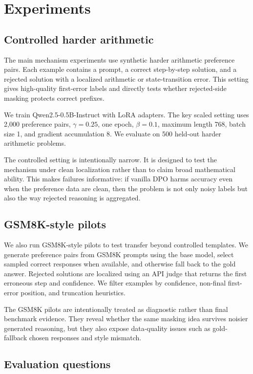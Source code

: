 \section{Experiments}

\subsection{Controlled harder arithmetic}

The main mechanism experiments use synthetic harder arithmetic preference pairs. Each example contains a prompt, a correct step-by-step solution, and a rejected solution with a localized arithmetic or state-transition error. This setting gives high-quality first-error labels and directly tests whether rejected-side masking protects correct prefixes.

We train Qwen2.5-0.5B-Instruct with LoRA adapters. The key scaled setting uses 2,000 preference pairs, $\gamma=0.25$, one epoch, $\beta=0.1$, maximum length 768, batch size 1, and gradient accumulation 8. We evaluate on 500 held-out harder arithmetic problems.

The controlled setting is intentionally narrow. It is designed to test the mechanism under clean localization rather than to claim broad mathematical ability. This makes failures informative: if vanilla DPO harms accuracy even when the preference data are clean, then the problem is not only noisy labels but also the way rejected reasoning is aggregated.

\subsection{GSM8K-style pilots}

We also run GSM8K-style pilots to test transfer beyond controlled templates. We generate preference pairs from GSM8K prompts using the base model, select sampled correct responses when available, and otherwise fall back to the gold answer. Rejected solutions are localized using an API judge that returns the first erroneous step and confidence. We filter examples by confidence, non-final first-error position, and truncation heuristics.

The GSM8K pilots are intentionally treated as diagnostic rather than final benchmark evidence. They reveal whether the same masking idea survives noisier generated reasoning, but they also expose data-quality issues such as gold-fallback chosen responses and style mismatch.

\subsection{Evaluation questions}

